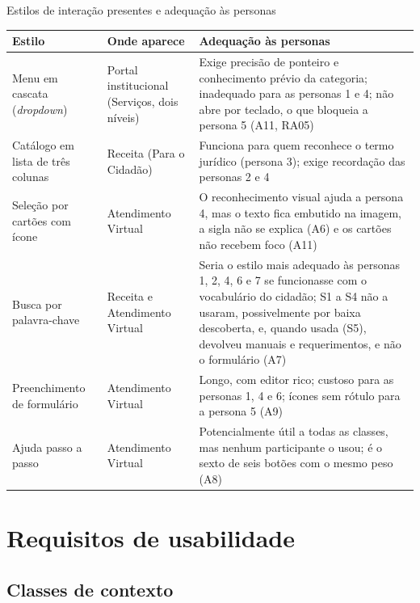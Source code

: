 \documentclass[
  12pt,
  oneside,
  a4paper,
  chapter=TITLE,
  section=TITLE,
  english,
  brazilian
]{abntex2}
\renewcommand{\fonte}[1]{\par\vspace{3pt}{\footnotesize\raggedright\noindent Fonte: #1\par}\vspace{4pt}}%
\begin{document}
\begin{quadro}[!htb]
  \caption{Estilos de interação presentes e adequação às personas}\label{qua:estilos}
  \centering\footnotesize
  \begin{tabularx}{\textwidth}{|P{2.6cm}|P{2.8cm}|Y|}\hline
    Estilo & Onde aparece & Adequação às personas \\\hline
    Menu em cascata (\textit{dropdown}) & Portal institucional (Serviços, dois níveis) & Exige precisão de ponteiro e conhecimento prévio da categoria; inadequado para as personas 1 e 4; não abre por teclado, o que bloqueia a persona 5 (A11, RA05) \\\hline
    Catálogo em lista de três colunas & Receita (Para o Cidadão) & Funciona para quem reconhece o termo jurídico (persona 3); exige recordação das personas 2 e 4 \\\hline
    Seleção por cartões com ícone & Atendimento Virtual & O reconhecimento visual ajuda a persona 4, mas o texto fica embutido na imagem, a sigla não se explica (A6) e os cartões não recebem foco (A11) \\\hline
    Busca por palavra-chave & Receita e Atendimento Virtual & Seria o estilo mais adequado às personas 1, 2, 4, 6 e 7 se funcionasse com o vocabulário do cidadão; S1 a S4 não a usaram, possivelmente por baixa descoberta, e, quando usada (S5), devolveu manuais e requerimentos, e não o formulário (A7) \\\hline
    Preenchimento de formulário & Atendimento Virtual & Longo, com editor rico; custoso para as personas 1, 4 e 6; ícones sem rótulo para a persona 5 (A9) \\\hline
    Ajuda passo a passo & Atendimento Virtual & Potencialmente útil a todas as classes, mas nenhum participante o usou; é o sexto de seis botões com o mesmo peso (A8) \\\hline
  \end{tabularx}
  \fonte{Elaborado pelos autores (2026).}
\end{quadro}\FloatBarrier

\chapter{Requisitos de usabilidade}\label{cap:requisitos}

\section{Classes de contexto}
\end{document}
